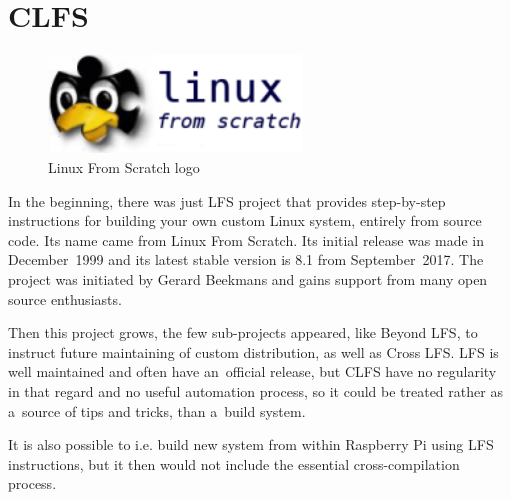\documentclass[printmode]{mgr}
\begin{document}


\section{CLFS}

\begin{figure}[htbp]
  \centering
    \includegraphics[width=0.6\textwidth]{lfs-logo.png}
    \caption{Linux From Scratch logo}
  \label{fig:lfs-logo}
\end{figure}


In the beginning, there was just LFS project that provides step-by-step instructions for building your own custom Linux system, entirely from source code.
Its name came from Linux From Scratch.
Its initial release was made in December~1999 and its latest stable version is 8.1 from September~2017. The project was initiated by Gerard Beekmans and gains support from many open source enthusiasts.

Then this project grows, the few sub-projects appeared, like Beyond LFS, to instruct future maintaining of custom distribution, as well as Cross LFS.
LFS is well maintained and often have an~official release, but CLFS have no regularity in that regard and no useful automation process, so it could be treated rather as a~source of tips and tricks, than a~build system.

It is also possible to i.e. build new system from within Raspberry Pi using LFS instructions, but it then would not include the essential cross-compilation process.


\end{document}
